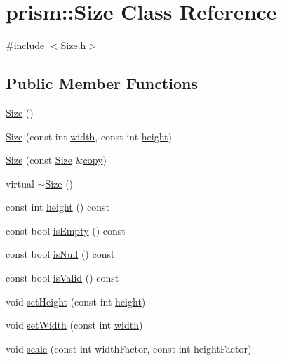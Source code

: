 \hypertarget{classprism_1_1_size}{}\section{prism\+:\+:Size Class Reference}
\label{classprism_1_1_size}


{\ttfamily \#include $<$Size.\+h$>$}

\subsection*{Public Member Functions}
\begin{DoxyCompactItemize}
\item 
\hyperlink{classprism_1_1_size_a61acf22a770bbca569b56d860bb95d0b}{Size} ()
\item 
\hyperlink{classprism_1_1_size_a115a8c5c7fcd709f2eaaff6e7a6c833a}{Size} (const int \hyperlink{classprism_1_1_size_a596f8cbdf0baa999e9652c702d58f0f3}{width}, const int \hyperlink{classprism_1_1_size_a1be5292609e9061f9637edc0d436e7eb}{height})
\item 
\hyperlink{classprism_1_1_size_a3eea778ebcf91dab6b8723fc5b7695e8}{Size} (const \hyperlink{classprism_1_1_size}{Size} \&\hyperlink{namespaceprism_ae776f4cd825f79e7af1cf6ee1d90a209}{copy})
\item 
virtual \hyperlink{classprism_1_1_size_ae29d928a0c3761b3d97d6f92b93676d7}{$\sim$\+Size} ()
\item 
const int \hyperlink{classprism_1_1_size_a1be5292609e9061f9637edc0d436e7eb}{height} () const 
\item 
const bool \hyperlink{classprism_1_1_size_a3a0aeaee6472ff145b6f308804f7c3a9}{is\+Empty} () const 
\item 
const bool \hyperlink{classprism_1_1_size_a1a10e8d131a5af7343f09749d01d5312}{is\+Null} () const 
\item 
const bool \hyperlink{classprism_1_1_size_a43047aee2065808f7cd43c6c4c717ceb}{is\+Valid} () const 
\item 
void \hyperlink{classprism_1_1_size_ab35fc21d1dfe330b8b589b1afb92de14}{set\+Height} (const int \hyperlink{classprism_1_1_size_a1be5292609e9061f9637edc0d436e7eb}{height})
\item 
void \hyperlink{classprism_1_1_size_a52a5e068c0346e6fcabe7002eb84ff7b}{set\+Width} (const int \hyperlink{classprism_1_1_size_a596f8cbdf0baa999e9652c702d58f0f3}{width})
\item 
void \hyperlink{classprism_1_1_size_ab97f1b2b8d01ef85ad106590b7a359b7}{scale} (const int width\+Factor, const int height\+Factor)

\end{DoxyCompactItemize}
